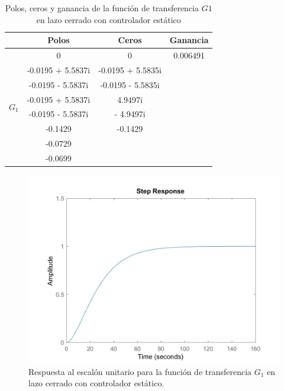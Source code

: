 \documentclass[journal]{IEEEtran}
\begin{document}
\begin{table}[!h]
\centering
\caption{Polos, ceros y ganancia de la función de transferencia $G1$ en lazo cerrado con controlador estático}
\label{tab: pzg tf1e}
\begin{tabular}{@{}lccc@{}}
\toprule
                  & Polos & Ceros             & Ganancia          \\ \midrule
\multirow{8}{*}{$G_1$} & 0 & 0 & 0.006491 \\
                       &   -0.0195 + 5.5837i      &     -0.0195 + 5.5835i      &         \\
                       &   -0.0195 - 5.5837i     &    -0.0195 - 5.5835i       &         \\
                       &   -0.0195 + 5.5837i      &   4.9497i        &         \\
                       &   -0.0195 - 5.5837i      &    - 4.9497i       &         \\
                       & -0.1429      &     -0.1429      &         \\
                       & -0.0729     &           &         \\
                       & -0.0699     &           &         \\
                       \bottomrule
\end{tabular}
\end{table}

\begin{figure}[h!]
\caption{Respuesta al escalón unitario para la función de transferencia $G_1$ en lazo cerrado con controlador estático.\label{fig:stepGc1}}
  \centering
\includegraphics[scale=0.18]{control/step_Gc1.jpg}
\end{figure}
\vspace{20pt}
\end{document}
